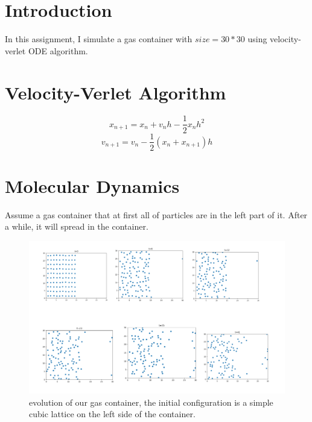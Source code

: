 \documentclass{article}
\begin{document}
\section{Introduction}
In this assignment, I simulate a gas container with $size=30*30$ using velocity-verlet ODE algorithm.
\section{Velocity-Verlet Algorithm}
\begin{equation}
   x_{n+1}=x_n+v_nh-\frac{1}{2}x_nh^2
\end{equation}
\begin{equation}
    v_{n+1}=v_n-\frac{1}{2}(x_n+x_{n+1})h
\end{equation}
\section{Molecular Dynamics}
Assume a gas container that at first all of particles are in the left part of it. After a while, it will spread in the container. 
\begin{figure}[H]
    \centering
    \includegraphics[width=1\linewidth]{gas.PNG}
    \vspace{-1cm}
    \caption{evolution of our gas container, the initial configuration is a simple cubic lattice on the left side of the container.}
\end{figure}
\end{document}
